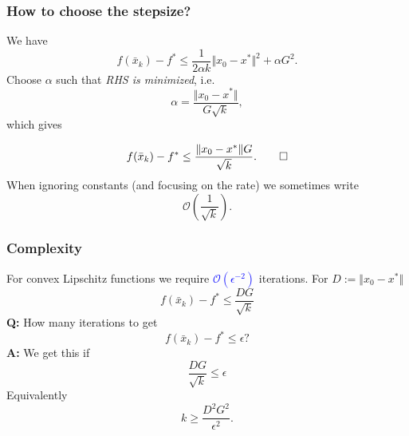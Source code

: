 \documentclass{beamer}
\begin{document}
\begin{frame}
  \frametitle{How to choose the stepsize?}
  We have
 \begin{equation}
    f(\bar{x}_k) - f^*  \le \frac{1}{2 \alpha k} \Vert x_0-x^* \Vert^2 + \alpha G^2.
  \end{equation}
  Choose $\alpha$ such that \textit{RHS is minimized}, i.e.\
  \begin{equation}
    \alpha = \frac{\Vert x_0-x^*\Vert }{G \sqrt{k}},
  \end{equation}
  which gives

  \begin{equation}
    f(\bar{x}_k) - f^* \le \frac{\Vert x_0-x^*\Vert G }{\sqrt{k}}. \qed
  \end{equation}
  When ignoring constants (and focusing on the rate) we sometimes write
  \begin{equation}
    \mathcal{O}\left(\frac{1}{\sqrt{k}}\right).
  \end{equation}
\end{frame}

\begin{frame}
  \frametitle{Complexity}
  For convex Lipschitz functions we require \textcolor{blue}{$\mathcal{O}(\epsilon^{-2})$} iterations. For $D:= \Vert x_0 -x^* \Vert$
  \begin{equation}
    f(\bar{x}_k) - f^* \le \frac{D G}{\sqrt{k}}
  \end{equation}
  \textbf{Q:} How many iterations to get
  \begin{equation}
    f(\bar{x}_k) - f^* \le \epsilon ?
  \end{equation}
  \textbf{A:} We get this if
  \begin{equation}
    \frac{D G}{\sqrt{k}} \le \epsilon
  \end{equation}
  Equivalently
  \begin{equation}
    k \ge \frac{D^2 G^2}{\epsilon^2}.
  \end{equation}
\end{frame}
\end{document}

